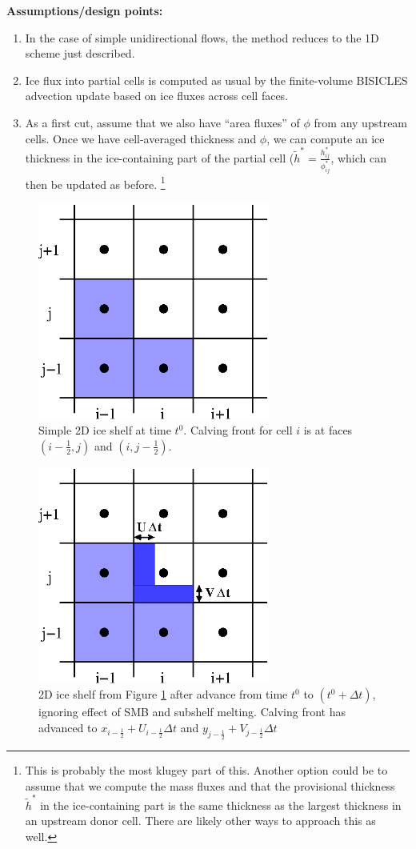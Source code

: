 \documentclass[12pt]{article}
\newcommand{\half}{\frac{1}{2}}
\begin{document}
{\bf Assumptions/design points:}
\begin{enumerate}
\item In the case of simple unidirectional flows, the method reduces to the 1D scheme just described.
\item Ice flux into partial cells is computed as usual by the finite-volume BISICLES advection update based on ice fluxes across cell faces.
\item As a first cut, assume that we also have ``area fluxes'' of $\phi$ from any upstream cells.  Once we have cell-averaged thickness and $\phi$, we can compute an ice thickness in the ice-containing part of the partial cell ($\tilde{h}^* = \frac{h^*_{ij}}{\phi^*_{ij}}$, which can then be updated as before. \footnote{This is probably the most klugey part of this. Another option could be to assume that we compute the mass fluxes and that the provisional thickness $\tilde{h}^*$ in the ice-containing part is the same thickness as the largest thickness in an upstream donor cell. There are likely other ways to approach this as well.}
\end{enumerate}
\begin{figure}
\centerline{
\includegraphics[width=3.0in]{calving3}  
}
\caption{Simple 2D ice shelf at time $t^0$. Calving front for cell $i$ is at faces $(i-\half,j)$ and $(i,j-\half)$.}
\label{fig:initial2D}
\end{figure}

\begin{figure}
\centerline{
\includegraphics[width=3.0in]{calving4}  
}
\caption{2D ice shelf from Figure \ref{fig:initial2D} after advance from time $t^0$ to $(t^0 + \Delta t)$, ignoring effect of SMB and subshelf melting.  Calving front has advanced to $x_{i-\half} + U_{i-\half}\Delta t$ and $y_{j-\half} + V_{j-\half}\Delta t$}
\label{fig:postAdvance2D}
\end{figure}
\end{document}
